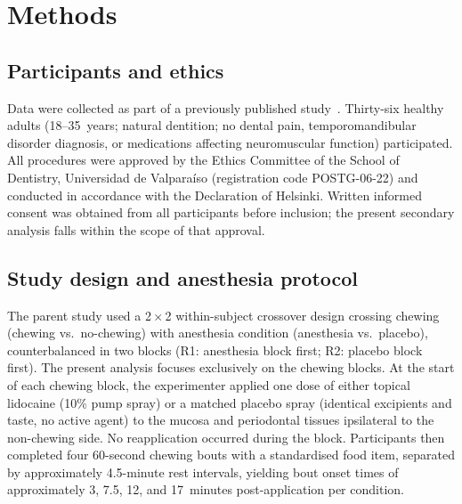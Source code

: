 ﻿\section*{Methods}

\subsection*{Participants and ethics}

Data were collected as part of a previously published study~\cite{espinoza2025}.
Thirty-six healthy adults (18--35~years; natural dentition; no dental pain,
temporomandibular disorder diagnosis, or medications affecting neuromuscular
function) participated.
All procedures were approved by the Ethics Committee of the School of Dentistry,
Universidad de Valpara\'{i}so (registration code POSTG-06-22) and conducted in
accordance with the Declaration of Helsinki.
Written informed consent was obtained from all participants before inclusion;
the present secondary analysis falls within the scope of that approval.

\subsection*{Study design and anesthesia protocol}

The parent study used a 2\,$\times$\,2 within-subject crossover design crossing
chewing (chewing vs.\ no-chewing) with anesthesia condition (anesthesia vs.\
placebo), counterbalanced in two blocks (R1: anesthesia block first; R2: placebo
block first).
The present analysis focuses exclusively on the chewing blocks.
At the start of each chewing block, the experimenter applied one dose of either
topical lidocaine (10\% pump spray) or a matched placebo spray (identical
excipients and taste, no active agent) to the mucosa and periodontal tissues
ipsilateral to the non-chewing side.
No reapplication occurred during the block.
Participants then completed four 60-second chewing bouts with a standardised
food item, separated by approximately 4.5-minute rest intervals, yielding bout
onset times of approximately 3, 7.5, 12, and 17~minutes post-application
per condition.

